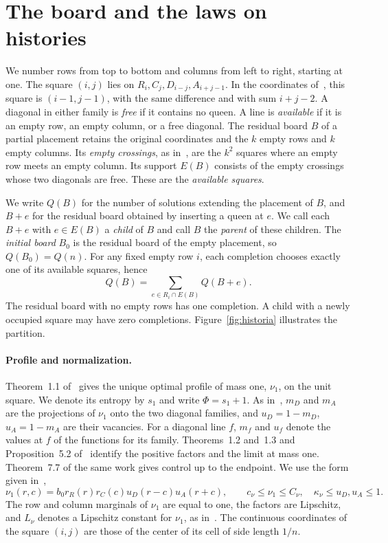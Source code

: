 \section{The board and the laws on histories}\label{leyes}
\begin{definicion}
We number rows from top to bottom and columns from left to right, starting at one. The square $(i,j)$ lies
on $R_i,C_j,D_{i-j},A_{i+j-1}$. In the coordinates of~\cite{perfil,ultimas}, this square is $(i-1,j-1)$,
with the same difference and with sum $i+j-2$. A diagonal in either family is \emph{free} if it contains
no queen. A line is \emph{available} if it is an empty row, an empty column, or a free diagonal. The
residual board $B$ of a partial placement retains the original coordinates and the $k$ empty rows and $k$
empty columns. Its \emph{empty crossings}, as in~\cite{ultimas}, are the $k^2$ squares where an empty row
meets an empty column. Its support $E(B)$ consists of the empty crossings whose two diagonals are free.
These are the \emph{available squares}.
\end{definicion}
We write $Q(B)$ for the number of solutions extending the placement of $B$, and $B+e$ for the residual
board obtained by inserting a queen at $e$. We call each $B+e$ with $e\in E(B)$ a \emph{child} of $B$ and
call $B$ the \emph{parent} of these children. The \emph{initial board} $B_0$ is the residual board of the
empty placement, so $Q(B_0)=Q(n)$. For any fixed empty row $i$, each completion chooses exactly one of its
available squares, hence
\begin{equation}\label{particion}
 Q(B)=\sum_{e\in R_i\cap E(B)}Q(B+e).
\end{equation}
The residual board with no empty rows has one completion. A child with a newly occupied square may have
zero completions. Figure~\ref{fig:historia} illustrates the partition.


\paragraph{Profile and normalization.}
Theorem~1.1 of~\cite{perfil} gives the unique optimal profile of mass one, $\nu_1$, on the unit square. We
denote its entropy by $s_1$ and write $\Phi=s_1+1$. As in~\cite{perfil,ultimas,pred}, $m_D$ and $m_A$ are
the projections of $\nu_1$ onto the two diagonal families, and $u_D=1-m_D$, $u_A=1-m_A$ are their
vacancies. For a diagonal line $f$, $m_f$ and $u_f$ denote the values at $f$ of the functions for its
family. Theorems~1.2 and~1.3 and Proposition~5.2 of~\cite{perfil} identify the positive factors and the
limit at mass one. Theorem~7.7 of the same work gives control up to the endpoint. We use the form given
in~\cite[Section~2]{pred},
\[
 \nu_1(r,c)=b_0 r_R(r)r_C(c)u_D(r-c)u_A(r+c),\qquad
 c_\nu\le\nu_1\le C_\nu,\quad \kappa_\nu\le u_D,u_A\le1.
\]
The row and column marginals of $\nu_1$ are equal to one, the factors are Lipschitz, and $L_\nu$ denotes a
Lipschitz constant for $\nu_1$, as in~\cite{pred}. The continuous coordinates of the square $(i,j)$ are
those of the center of its cell of side length $1/n$.

